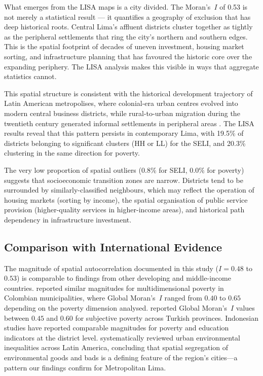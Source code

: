 \documentclass[12pt,a4paper,twoside]{article}
\begin{document}
What emerges from the LISA maps is a city divided. The Moran's~$I$ of 0.53
is not merely a statistical result --- it quantifies a geography of exclusion
that has deep historical roots. Central Lima's affluent districts cluster
together as tightly as the peripheral settlements that ring the city's northern
and southern edges. This is the spatial footprint of decades of uneven
investment, housing market sorting, and infrastructure planning that has
favoured the historic core over the expanding periphery. The LISA analysis
makes this visible in ways that aggregate statistics cannot.

This spatial structure is consistent with the historical development trajectory
of Latin American metropolises, where colonial-era urban centres evolved into
modern central business districts, while rural-to-urban migration during the
twentieth century generated informal settlements in peripheral areas
\citep{gonzalez2025pobreza}. The LISA results reveal that this pattern persists
in contemporary Lima, with 19.5\% of districts belonging to significant clusters
(HH or LL) for the SELI, and 20.3\% clustering in the same direction for poverty.

The very low proportion of spatial outliers (0.8\% for SELI, 0.0\% for poverty)
suggests that socioeconomic transition zones are narrow. Districts tend to be
surrounded by similarly-classified neighbours, which may reflect the operation
of housing markets (sorting by income), the spatial organisation of public
service provision (higher-quality services in higher-income areas), and
historical path dependency in infrastructure investment.

\subsection{Comparison with International Evidence}

The magnitude of spatial autocorrelation documented in this study ($I = 0.48$
to $0.53$) is comparable to findings from other developing and middle-income
countries. \citet{gonzalez2025pobreza} reported similar magnitudes for
multidimensional poverty in Colombian municipalities, where Global Moran's~$I$
ranged from $0.40$ to $0.65$ depending on the poverty dimension analysed.
\citet{tatli2025subjective} reported Global Moran's~$I$ values between $0.45$
and $0.60$ for subjective poverty across Turkish provinces. Indonesian studies
\citep{lestari2023bali, oktavilia2026mapping} have reported comparable
magnitudes for poverty and education indicators at the district level.
\citet{fernandez2023urban} systematically reviewed urban environmental
inequalities across Latin America, concluding that spatial segregation
of environmental goods and bads is a defining feature of the region's
cities---a pattern our findings confirm for Metropolitan Lima.
\end{document}
